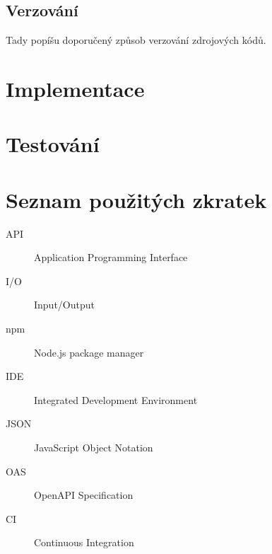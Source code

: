 \documentclass[thesis=B,czech]{FITthesis}[2012/06/26]
\begin{document}
    \section{Verzování}
        Tady popíšu doporučený způsob verzování zdrojových kódů.

\chapter{Implementace}

\chapter{Testování}

\begin{conclusion}
\end{conclusion}




\appendix

\chapter{Seznam použitých zkratek}
\begin{description}
	\item[API] Application Programming Interface
	\item[I/O] Input/Output
	\item[npm] Node.js package manager
	\item[IDE] Integrated Development Environment
	\item[JSON] JavaScript Object Notation
	\item[OAS] OpenAPI Specification
	\item[CI] Continuous Integration
\end{description}
\end{document}
